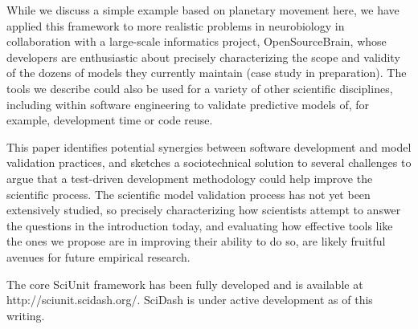 \documentclass[9pt]{sig-alternate}
\begin{document}
While we discuss a simple example based on planetary movement here, we have applied this framework to more realistic problems in neurobiology in collaboration with a large-scale informatics project, OpenSourceBrain, whose developers are enthusiastic about precisely characterizing the scope and validity of the dozens of models they currently maintain (case study in preparation). The tools we describe could also be used for a variety of other scientific disciplines, including within software engineering to validate predictive models of, for example, development time or code reuse.

This paper identifies potential  synergies between software development and model validation practices, and sketches a sociotechnical solution to several challenges to argue that a test-driven development methodology could help improve the scientific process. The scientific model validation process has not yet been extensively studied, so precisely characterizing how scientists attempt to answer the questions in the introduction today, and evaluating how effective tools like the ones we propose are in improving their ability to do so, are likely fruitful avenues for future empirical research. 

The core SciUnit framework has been fully developed and is available at http://sciunit.scidash.org/. SciDash is under active development as of this writing.
\vspace{5px}
\end{document}

